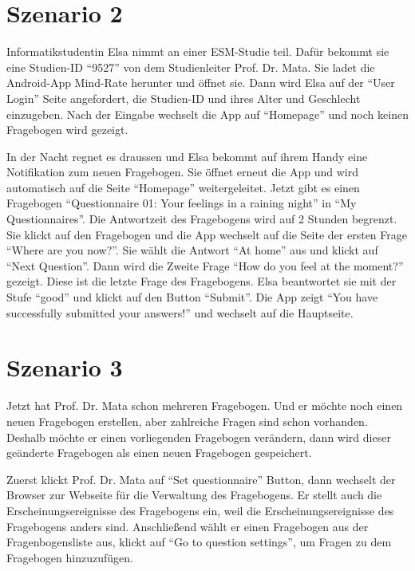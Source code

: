 \documentclass[a4paper]{scrreprt}
\begin{document}
            \section{Szenario 2}
	            \par Informatikstudentin Elsa nimmt an einer ESM-Studie teil. Dafür bekommt sie eine Studien-ID ``9527'' von dem Studienleiter Prof. Dr. Mata. Sie ladet die Android-App Mind-Rate herunter und \"offnet sie. Dann wird Elsa auf der ``User Login'' Seite angefordert, die Studien-ID und ihres Alter und Geschlecht einzugeben. Nach der Eingabe wechselt die App auf ``Homepage'' und noch keinen Fragebogen wird gezeigt.
                
	            \par In der Nacht regnet es draussen und Elsa bekommt auf ihrem Handy eine Notifikation zum neuen Fragebogen. Sie \"offnet erneut die App und wird automatisch auf die Seite ``Homepage'' weitergeleitet. Jetzt gibt es einen Fragebogen ``Questionnaire 01: Your feelings in a raining night'' in ``My Questionnaires''. Die Antwortzeit des Fragebogens wird auf 2 Stunden begrenzt. Sie klickt auf den Fragebogen und die App wechselt auf die Seite der ersten Frage ``Where are you now?''. Sie w\"ahlt die Antwort ``At home'' aus und klickt auf ``Next Question''. Dann wird die Zweite Frage ``How do you feel at the moment?'' gezeigt. Diese ist die letzte Frage des Fragebogens. Elsa beantwortet sie mit der Stufe ``good'' und klickt auf den Button ``Submit''. Die App zeigt “You have successfully submitted your answers!” und wechselt auf die Hauptseite.

            \section{Szenario 3}
                \par Jetzt hat Prof. Dr. Mata schon mehreren Fragebogen. Und er möchte noch einen neuen Fragebogen erstellen, aber zahlreiche Fragen sind schon vorhanden. Deshalb möchte er einen vorliegenden Fragebogen verändern, dann wird dieser geänderte Fragebogen als einen neuen Fragebogen gespeichert.
                
                \par Zuerst klickt Prof. Dr. Mata auf ``Set questionnaire'' Button, dann wechselt der Browser zur Webseite für die Verwaltung des Fragebogens. Er stellt auch die Erscheinungsereignisse des Fragebogens ein, weil die Erscheinungsereignisse des Fragebogens anders sind. Anschließend wählt er einen Fragebogen aus der Fragenbogensliste aus, klickt auf ``Go to question settings'', um Fragen zu dem Fragebogen hinzuzufügen.
                
\end{document}
